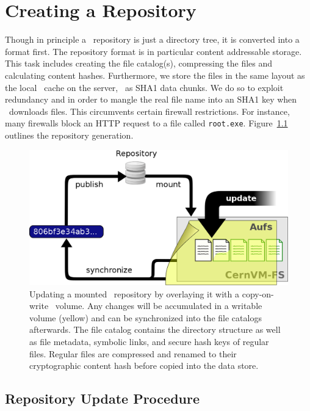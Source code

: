 \chapter{Creating a Repository}
\label{sct:createrepo}

Though in principle a \cvmfs\ repository is just a directory tree, it is converted into a  format first.
The repository format is in particular content addressable storage.
This task includes creating the file catalog(s), compressing the files and calculating content hashes.
Furthermore, we store the files in the same layout as the local \cvmfs\ cache on the server, \ie\ as SHA1 data chunks.
We do so to exploit redundancy and in order to mangle the real file name into an SHA1 key when \cvmfs\ downloads files.
This circumvents certain firewall restrictions.
For instance, many firewalls block an HTTP request to a file called \texttt{root.exe}.
Figure~\ref{fig:installwebserver} outlines the repository generation.

\begin{figure}[h]
		\includegraphics[width=\textwidth]{figures/update_process.png}
	\caption{Updating a mounted \cvmfs\ repository by overlaying it with a copy-on-write \aufs\ volume. Any changes will be accumulated in a writable volume (yellow) and can be synchronized into the file catalogs afterwards. The file catalog contains the directory structure as well as file metadata, symbolic links, and secure hash keys of regular files. Regular files are compressed and renamed to their cryptographic content hash before copied into the data store.}
	\label{fig:installwebserver}
\end{figure}

\section{Repository Update Procedure}
\label{sct:repoupdate}

